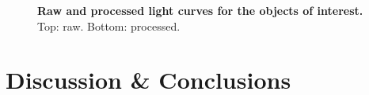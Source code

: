 \documentclass[12pt,modern,tighten]{aastex63}
\begin{document}
\begin{figure}[tp]
\begin{center}
	\end{center}
	\vspace{-0.7cm}
	\caption{
		{\bf Raw and processed light curves for the objects of
    interest.} Top: raw.  Bottom: processed.
		\label{fig:planets}
	}
\end{figure}


\section{Discussion \& Conclusions}
\label{sec:conc}
\end{document}
